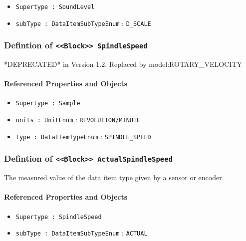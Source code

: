 \begin{itemize}
\item \texttt{Supertype : SoundLevel}

\item \texttt{subType : DataItemSubTypeEnum} : \texttt{D_SCALE}

\end{itemize}
\FloatBarrier
\subsubsection{Defintion of \texttt{<<Block>> SpindleSpeed}}
  \label{type:SpindleSpeed}

\FloatBarrier

*DEPRECATED* in Version 1.2.  Replaced by {model:ROTARY_VELOCITY}

\FloatBarrier
\paragraph{Referenced Properties and Objects}

\begin{itemize}
\item \texttt{Supertype : Sample}

\item \texttt{units : UnitEnum} : \texttt{REVOLUTION/MINUTE}

\item \texttt{type : DataItemTypeEnum} : \texttt{SPINDLE_SPEED}

\end{itemize}
\FloatBarrier
\subsubsection{Defintion of \texttt{<<Block>> ActualSpindleSpeed}}
  \label{type:ActualSpindleSpeed}

\FloatBarrier

The measured value of the data item type given by a sensor or encoder.

\FloatBarrier
\paragraph{Referenced Properties and Objects}

\begin{itemize}
\item \texttt{Supertype : SpindleSpeed}

\item \texttt{subType : DataItemSubTypeEnum} : \texttt{ACTUAL}

\end{itemize}
\FloatBarrier
